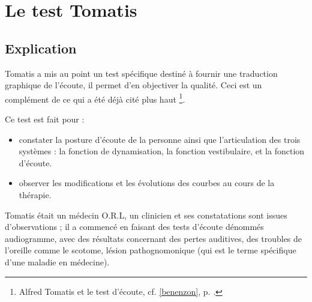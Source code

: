 \chapter{Le test Tomatis}

\section{Explication}

Tomatis a mis au point un test spécifique destiné à fournir une traduction
graphique de l'écoute, il permet d'en objectiver la qualité. Ceci est un complément de ce qui a été déjà cité plus haut%
 \footnote{Alfred Tomatis et le test d'écoute, cf. \ref{benenzon}, p. \pageref{benenzon}.}.
 

Ce test est fait pour :
\begin{itemize}
\item constater la posture d'écoute de la personne ainsi que l'articulation
des trois systèmes : la fonction de dynamisation, la fonction vestibulaire,
et la fonction d'écoute.
\item observer les modifications et les évolutions des courbes au cours
de la thérapie.
\end{itemize}
Tomatis était un médecin O.R.L, un clinicien et  ses constatations
sont issues d'observations ; il a commencé en faisant
des tests d'écoute dénommés audiogramme, avec des résultats concernant  des pertes auditives, des troubles de l'oreille
comme le scotome, lésion pathognomonique (qui est le terme spécifique
d'une maladie en médecine). 

